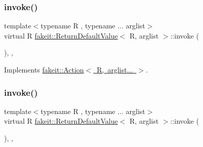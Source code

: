 \subsubsection{\texorpdfstring{invoke()}{invoke()}\hspace{0.1cm}{\footnotesize\ttfamily [1/9]}}
{\footnotesize\ttfamily template$<$typename R , typename ... arglist$>$ \\
virtual R \mbox{\hyperlink{structfakeit_1_1ReturnDefaultValue}{fakeit\+::\+Return\+Default\+Value}}$<$ R, arglist $>$\+::invoke (\begin{DoxyParamCaption}\item[{const \mbox{\hyperlink{namespacefakeit_a476a37a598825e1b5dd67b3a176491a1}{Arguments\+Tuple}}$<$ arglist... $>$ \&}]{ }\end{DoxyParamCaption})\hspace{0.3cm}{\ttfamily [inline]}, {\ttfamily [override]}, {\ttfamily [virtual]}}



Implements \mbox{\hyperlink{structfakeit_1_1Action_a85503300bf8134ce55761db5f643b00c}{fakeit\+::\+Action$<$ R, arglist... $>$}}.

\mbox{\label{structfakeit_1_1ReturnDefaultValue_a9b57c8c162e162b97415595f966e9c4a}} 
\subsubsection{\texorpdfstring{invoke()}{invoke()}\hspace{0.1cm}{\footnotesize\ttfamily [2/9]}}
{\footnotesize\ttfamily template$<$typename R , typename ... arglist$>$ \\
virtual R \mbox{\hyperlink{structfakeit_1_1ReturnDefaultValue}{fakeit\+::\+Return\+Default\+Value}}$<$ R, arglist $>$\+::invoke (\begin{DoxyParamCaption}\item[{const \mbox{\hyperlink{namespacefakeit_a476a37a598825e1b5dd67b3a176491a1}{Arguments\+Tuple}}$<$ arglist... $>$ \&}]{ }\end{DoxyParamCaption})\hspace{0.3cm}{\ttfamily [inline]}, {\ttfamily [override]}, {\ttfamily [virtual]}}



